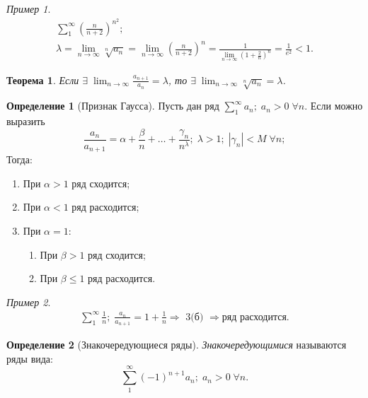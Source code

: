 \documentclass[a4paper,12pt]{article}
\newtheorem*{theorem}{Теорема}
\theoremstyle{remark}
\newtheorem*{example}{Пример}
\theoremstyle{definition}
\newtheorem{definition}{Определение}
\begin{document}
\begin{example}
	\begin{gather*}
		\sum_1^\infty \left(\frac{n}{n+2}\right)^{n^2}; \\
		\lambda = \lim_{n \rightarrow \infty} \sqrt[n]{a_n} = \lim_{n \rightarrow \infty} \left(\frac{n}{n+2}\right)^n = \frac{1}{\lim\limits_{n \rightarrow \infty} \left(1 + \frac{2}{n}\right)^n} = \frac{1}{e^2} < 1.
	\end{gather*}
\end{example}

\begin{theorem}
	Если \(\exists\; \lim_{n \rightarrow \infty} \frac{a_{n+1}}{a_n} = \lambda\), то \(\exists\; \lim_{n \rightarrow \infty} \sqrt[n]{a_n} = \lambda\).
\end{theorem}

\begin{definition}[Признак Гаусса]
	Пусть дан ряд \(\sum_1^\infty a_n;\; a_n > 0 \;\forall n\). Если можно выразить
	\begin{equation*}
		\frac{a_n}{a_{n+1}} = \alpha + \frac{\beta}{n} + \dots + \frac{\gamma_n}{n^\lambda};\; \lambda > 1;\; |\gamma_n| < M \;\forall n;
	\end{equation*}
	Тогда:
	\begin{enumerate}
		\item При \(\alpha > 1\) ряд сходится;
		\item При \(\alpha < 1\) ряд расходится;
		\item При \(\alpha = 1\):
		\begin{enumerate}
			\item При \(\beta > 1\) ряд сходится;
			\item При \(\beta \leqslant 1\) ряд расходится.
		\end{enumerate}
	\end{enumerate}
\end{definition}

\begin{example}
	\begin{gather*}
		\sum_1^\infty \frac{1}{n};\; \frac{a_n}{a_{n+1}} = 1 + \frac{1}{n} \Rightarrow \text{ 3(б) } \Rightarrow \text{ряд расходится.}
	\end{gather*}
\end{example}


\begin{definition}[Знакочередующиеся ряды]
	\emph{Знакочередующимися} называются ряды вида:
	\begin{equation*}
		\sum_1^\infty (-1)^{n+1} a_n;\; a_n > 0 \;\forall n.
	\end{equation*}
\end{definition}
\end{document}
